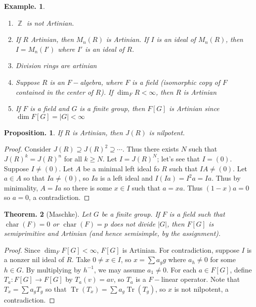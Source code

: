 \documentclass[11pt, a4paper]{memoir}
\DeclareMathOperator{\Z}{{\mathbb{Z}}}
\theoremstyle{change}
\newtheorem{theorem}{Theorem.}[section]
\newtheorem{proposition}[theorem]{Proposition.}
\theoremstyle{plain}
\theoremstyle{nonumberplain}
\newtheorem{example}{Example.}
\newtheorem{proof}{Proof}
\DeclareMathOperator{\chr}{char}
\DeclareMathOperator{\Tr}{Tr}
\numberwithin{equation}{section}
\begin{document}
\begin{example}
    \begin{enumerate}[nl,r]
        \item $\Z$ is not Artinian.
        \item If $R$ Artinian, then $M_n(R)$ is Artinian.
            If $I$ is an ideal of $M_n(R)$, then $I=M_n(I')$ where $I'$ is an ideal of $R$.
        \item Division rings are artinian
        \item Suppose $R$ is an $F-$algebra, where $F$ is a field (isomorphic copy of $F$ contained in the center of $R$).
            If $\dim_FR<\infty$, then $R$ is Artinian
        \item If $F$ is a field and $G$ is a finite group, then $F[G]$ is Artinian since $\dim F[G]=|G|<\infty$
    \end{enumerate}
\end{example}
\begin{proposition}
    If $R$ is Artinian, then $J(R)$ is nilpotent.
\end{proposition}
\begin{proof}
    Consider $J(R)\supseteq J(R)^2\supseteq\cdots$.
    Thus there exists $N$ such that $J(R)^k=J(R)^n$ for all $k\geq N$.
    Let $I=J(R)^N$; let's see that $I=(0)$.
    Suppose $I\neq (0)$.
    Let $A$ be a minimal left ideal fo $R$ such that $IA\neq (0)$.
    Let $a\in A$ so that $Ia\neq(0)$, so $Ia$ is a left ideal and $I(Ia)=I^2a=Ia$.
    Thus by minimality, $A=Ia$ so there is some $x\in I$ such that $a=xa$.
    Thus $(1-x)a=0$ so $a=0$, a contradiction.
\end{proof}
\begin{theorem}[Maschke]
    Let $G$ be a finite group.
    If $F$ is a field such that $\chr(F)=0$ or $\chr(F)=p$ does not divide $|G|$, then $F[G]$ is semiprimitive and Artinian (and hence semisimple, by the assignment).
\end{theorem}
\begin{proof}
    Since $\dim_F F[G]<\infty$, $F[G]$ is Artinian.
    For contradiction, suppose $I$ is a nonzer nil ideal of $R$.
    Take $0\neq x\in I$, so $x=\sum a_gg$ where $a_h\neq 0$ for some $h\in G$.
    By multiplying by $h^{-1}$, we may assume $a_1\neq 0$.
    For each $a\in F[G]$, define $T_a:F[G]\to F[G]$ by $T_a(v)=av$, so $T_a$ is a $F-$linear operator.
    Note that $T_x=\sum a_gT_g$ so that $\Tr(T_x)=\sum a_g\Tr(T_g)$, so $x$ is not nilpotent, a contradiction.
\end{proof}
\end{document}

